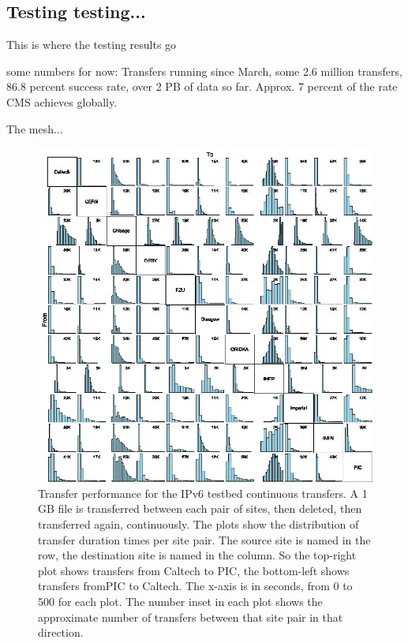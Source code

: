 \subsection{Testing testing...}
This is where the testing results go

some numbers for now: Transfers running since March, some 2.6 million transfers, 86.8 percent success
rate, over 2 PB of data so far. Approx. 7 percent of the rate CMS achieves globally.

The mesh...

\begin{figure}[htp]
\centering
\includegraphics{full-mesh}
\caption{Transfer performance for the IPv6 testbed continuous transfers. A 1 GB file is transferred between each pair of sites, then deleted, then transferred again, continuously. The plots show the distribution of transfer duration times per site pair. The source site is named in the row, the destination site is named in the column. So the top-right plot shows transfers from Caltech to PIC, the bottom-left shows transfers fromPIC to Caltech. The x-axis is in seconds, from 0 to 500 for each plot. The number inset in each plot shows the approximate number of transfers between that site pair in that direction.}\label{fig:full-mesh}
\end{figure}

